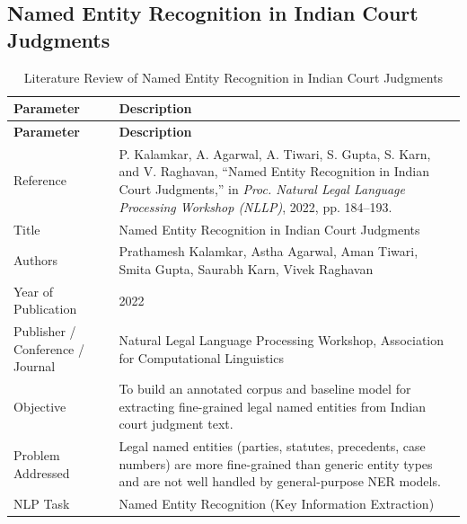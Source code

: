 \subsection{Named Entity Recognition in Indian Court Judgments}

\def\PaperTitle{NER in Indian Court Judgments}
\def\PaperLabel{tab:paper5}

\renewcommand{\arraystretch}{1.4}

\begin{longtable}{|p{5cm}|p{10cm}|}
\caption{Literature Review of Named Entity Recognition in Indian Court Judgments}
\label{tab:paper5}\\

\hline
\textbf{Parameter} & \textbf{Description} \\
\hline
\endfirsthead

\hline
\textbf{Parameter} & \textbf{Description} \\
\hline
\endhead

Reference &
P. Kalamkar, A. Agarwal, A. Tiwari, S. Gupta, S. Karn, and V. Raghavan, ``Named Entity Recognition in Indian Court Judgments,'' in \textit{Proc. Natural Legal Language Processing Workshop (NLLP)}, 2022, pp. 184--193.
\\ \hline

Title &
Named Entity Recognition in Indian Court Judgments
\\ \hline

Authors &
Prathamesh Kalamkar, Astha Agarwal, Aman Tiwari, Smita Gupta, Saurabh Karn, Vivek Raghavan
\\ \hline

Year of Publication &
2022
\\ \hline

Publisher / Conference / Journal &
Natural Legal Language Processing Workshop, Association for Computational Linguistics
\\ \hline

Objective &
To build an annotated corpus and baseline model for extracting fine-grained legal named entities from Indian court judgment text.
\\ \hline

Problem Addressed &
Legal named entities (parties, statutes, precedents, case numbers) are more fine-grained than generic entity types and are not well handled by general-purpose NER models.
\\ \hline

NLP Task &
Named Entity Recognition (Key Information Extraction)
\\ \hline


\end{longtable}
